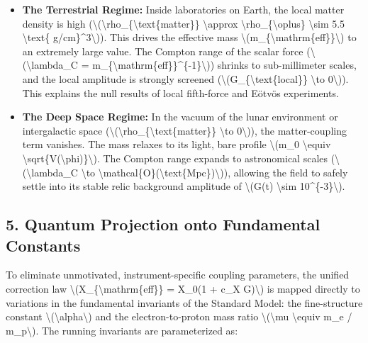 \documentclass[
  10pt,
]{article}
\providecommand{\tightlist}{%
  \setlength{\itemsep}{0pt}\setlength{\parskip}{0pt}}
\begin{document}
\begin{itemize}
\tightlist
\item
  \textbf{The Terrestrial Regime:} Inside laboratories on Earth, the
  local matter density is high
  (\textbackslash(\textbackslash rho\_\{\textbackslash text\{matter\}\}
  \textbackslash approx \textbackslash rho\_\{\textbackslash oplus\}
  \textbackslash sim 5.5 \textbackslash text\{
  g/cm\}\^{}3\textbackslash)). This drives the effective mass
  \textbackslash(m\_\{\textbackslash mathrm\{eff\}\}\textbackslash) to
  an extremely large value. The Compton range of the scalar force
  (\textbackslash(\textbackslash lambda\_C =
  m\_\{\textbackslash mathrm\{eff\}\}\^{}\{-1\}\textbackslash)) shrinks
  to sub-millimeter scales, and the local amplitude is strongly screened
  (\textbackslash(G\_\{\textbackslash text\{local\}\} \textbackslash to
  0\textbackslash)). This explains the null results of local fifth-force
  and Eötvös experiments.
\item
  \textbf{The Deep Space Regime:} In the vacuum of the lunar environment
  or intergalactic space
  (\textbackslash(\textbackslash rho\_\{\textbackslash text\{matter\}\}
  \textbackslash to 0\textbackslash)), the matter-coupling term
  vanishes. The mass relaxes to its light, bare profile
  \textbackslash(m\_0 \textbackslash equiv
  \textbackslash sqrt\{V\textquotesingle\textquotesingle(\textbackslash phi)\}\textbackslash).
  The Compton range expands to astronomical scales
  (\textbackslash(\textbackslash lambda\_C \textbackslash to
  \textbackslash mathcal\{O\}(\textbackslash text\{Mpc\})\textbackslash)),
  allowing the field to safely settle into its stable relic background
  amplitude of \textbackslash(G(t) \textbackslash sim
  10\^{}\{-3\}\textbackslash).
\end{itemize}

\hypertarget{quantum-projection-onto-fundamental-constants}{%
\subsection{5. Quantum Projection onto Fundamental
Constants}\label{quantum-projection-onto-fundamental-constants}}

To eliminate unmotivated, instrument-specific coupling parameters, the
unified correction law
\textbackslash(X\_\{\textbackslash mathrm\{eff\}\} = X\_0(1 + c\_X
G)\textbackslash) is mapped directly to variations in the fundamental
invariants of the Standard Model: the fine-structure constant
\textbackslash(\textbackslash alpha\textbackslash) and the
electron-to-proton mass ratio \textbackslash(\textbackslash mu
\textbackslash equiv m\_e / m\_p\textbackslash). The running invariants
are parameterized as:
\end{document}
